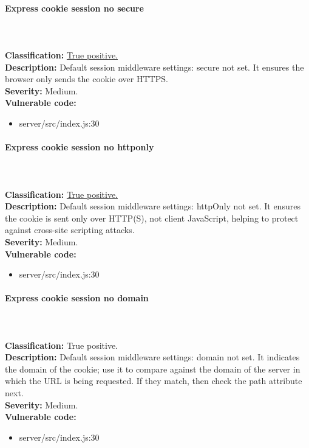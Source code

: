 \documentclass[]{article}
\begin{document}
\paragraph{Express cookie session no secure} \mbox{} \\ \\
\textbf{Classification:} \hyperref[subsubsec:sensitive_cookie_without_secure_and_httponly_attributes]{True positive.} \\ 
\textbf{Description:} Default session middleware settings: secure not set. It ensures the browser only
 sends the cookie over HTTPS. \\ 
\textbf{Severity:} Medium. \\ 
\textbf{Vulnerable code:} 
\begin{itemize}
    \item server/src/index.js:30
\end{itemize}

\paragraph{Express cookie session no httponly} \mbox{} \\ \\
\textbf{Classification:} \hyperref[subsubsec:cross_site_scripting]{True positive.} \\ 
\textbf{Description:} Default session middleware settings: httpOnly not set. It ensures the cookie is sent 
only over HTTP(S), not client JavaScript, helping to protect against cross-site scripting attacks. \\ 
\textbf{Severity:} Medium. \\ 
\textbf{Vulnerable code:} 
\begin{itemize}
    \item server/src/index.js:30
\end{itemize}

\paragraph{Express cookie session no domain} \mbox{} \\ \\
\textbf{Classification:} True positive. \\ 
\textbf{Description:} Default session middleware settings: domain not set. It indicates the domain of 
the cookie; use it to compare against the domain of the server in which the URL is being requested. 
If they match, then check the path attribute next. \\ 
\textbf{Severity:} Medium. \\ 
\textbf{Vulnerable code:} 
\begin{itemize}
    \item server/src/index.js:30
\end{itemize}
\end{document}
